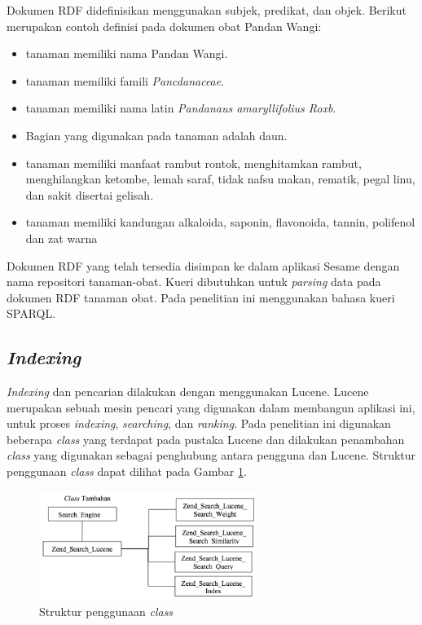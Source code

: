 Dokumen RDF didefinisikan menggunakan subjek, predikat, dan objek. Berikut merupakan contoh definisi pada dokumen obat Pandan Wangi:
\begin{itemize}
\item tanaman memiliki nama Pandan Wangi.
\item tanaman memiliki famili \textit{Pancdanaceae}.
\item tanaman memiliki nama latin \textit{Pandanaus amaryllifolius Roxb}.
\item Bagian yang digunakan pada tanaman adalah daun.
\item tanaman memiliki manfaat rambut rontok, menghitamkan rambut, menghilangkan ketombe, lemah saraf, tidak nafsu makan, rematik, pegal linu, dan sakit disertai gelisah.
\item tanaman memiliki kandungan alkaloida, saponin, flavonoida, tannin, polifenol dan zat warna
\end{itemize}

Dokumen RDF yang telah tersedia disimpan ke dalam aplikasi Sesame dengan nama repositori tanaman-obat. Kueri dibutuhkan untuk \textit{parsing} data pada dokumen RDF tanaman obat. Pada penelitian ini menggunakan bahasa kueri SPARQL.

\subsection*{\textit{Indexing}}
\textit{Indexing} dan pencarian dilakukan dengan menggunakan Lucene. Lucene merupakan sebuah mesin pencari yang digunakan dalam membangun aplikasi ini, untuk proses \textit{indexing}, \textit{searching}, dan \textit{ranking}. Pada penelitian ini digunakan beberapa \textit{class} yang terdapat pada pustaka Lucene dan dilakukan penambahan \textit{class} yang digunakan sebagai penghubung antara pengguna dan Lucene. Struktur penggunaan \textit{class} dapat dilihat pada Gambar \ref{fig:class}.

\begin{figure}[h!] %
\centering
\includegraphics[width=200pt]{class.png}
\caption{Struktur penggunaan \textit{class}}
\label{fig:class}
\end{figure}

